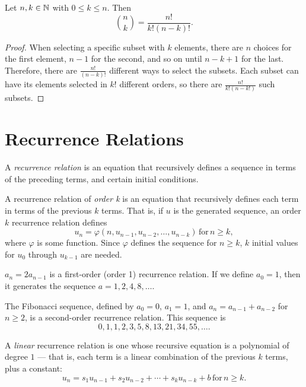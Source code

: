 \begin{prop}
    Let $n, k \in \mathbb{N}$ with $0 \leq k \leq n$. Then \[\binom{n}{k} = \frac{n!}{k!(n-k)!}.\]
\end{prop}

\begin{proof}
    When selecting a specific subset with $k$ elements, there are $n$ choices for the first element, $n-1$ for the second, and so on until $n-k+1$ for the last. Therefore, there are $\frac{n!}{(n-k)!}$ different ways to select the subsets. Each subset can have its elements selected in $k!$ different orders, so there are $\frac{n!}{k!(n-k!)}$ such subsets.
\end{proof}

\section{Recurrence Relations}

\begin{defn}
    A \emph{recurrence relation} is an equation that recursively defines a sequence in terms of the preceding terms, and certain initial conditions.
\end{defn}

\begin{defn}
    A recurrence relation of \emph{order k} is an equation that recursively defines each term in terms of the previous $k$ terms. That is, if $u$ is the generated sequence, an order $k$ recurrence relation defines \[u_n = \varphi(n, u_{n-1}, u_{n-2}, \ldots, u_{n-k}) \,\textrm{for}\, n \geq k,\] where $\varphi$ is some function. Since $\varphi$ defines the sequence for $n \geq k$, $k$ initial values for $u_0$ through $u_{k-1}$ are needed.
\end{defn}

\begin{exmp}
    $a_n = 2a_{n-1}$ is a first-order (order 1) recurrence relation. If we define $a_0 = 1$, then it generates the sequence $a = 1, 2, 4, 8, \ldots$.
\end{exmp}

\begin{exmp}
    The Fibonacci sequence, defined by $a_0 = 0$, $a_1 = 1$, and $a_n = a_{n-1} + a_{n-2}$ for $n \geq 2$, is a second-order recurrence relation. This sequence is \[0, 1, 1, 2, 3, 5, 8, 13, 21, 34, 55, \ldots.\]
\end{exmp}

\begin{defn}
    A \emph{linear} recurrence relation is one whose recursive equation is a polynomial of degree $1$ --- that is, each term is a linear combination of the previous $k$ terms, plus a constant: \[u_n = s_1u_{n-1} + s_2u_{n-2} + \cdots + s_ku_{n-k} + b \,\textrm{for}\, n \geq k.\]
\end{defn}

